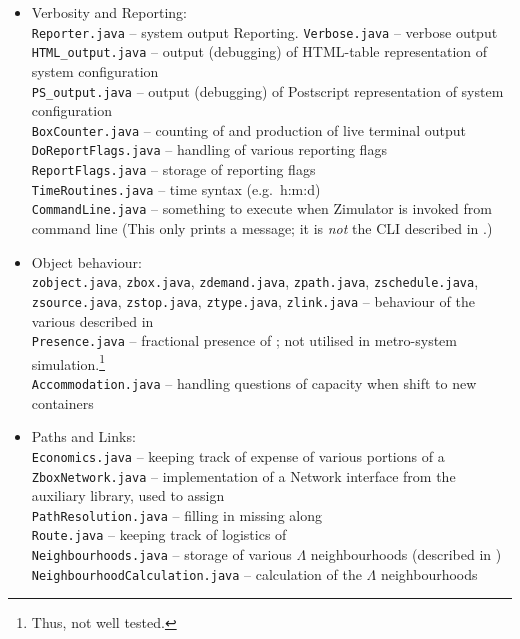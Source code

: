 \begin{itemize}
\item Verbosity and Reporting:  \\
  {\tt Reporter.java} -- system output Reporting.
  {\tt Verbose.java} -- verbose output
  {\tt HTML\_output.java} -- output (debugging) of HTML-table representation of system  configuration\\
  {\tt PS\_output.java} -- output (debugging) of Postscript representation of system  configuration\\
  {\tt BoxCounter.java} -- counting of  and production of live terminal output\\
  {\tt DoReportFlags.java} -- handling of various reporting flags\\
  {\tt ReportFlags.java} -- storage of reporting flags\\
  {\tt TimeRoutines.java} -- time syntax (e.g.~h:m:d)\\
  {\tt CommandLine.java} -- something to execute when Zimulator is invoked from command line
  (This only prints a message; it is \emph{not} the CLI described in .)
\item Object behaviour:\\
  {\tt  zobject.java},
  {\tt  zbox.java},
  {\tt  zdemand.java},
  {\tt  zpath.java},
  {\tt  zschedule.java},
  {\tt  zsource.java},
  {\tt  zstop.java},
  {\tt  ztype.java},
  {\tt  zlink.java} -- behaviour of the various  described in \\
{\tt  Presence.java} -- fractional presence of ; not utilised in metro-system simulation.\footnote{Thus, not well tested.}\\
{\tt  Accommodation.java} -- handling questions of capacity when  shift to new containers
\item Paths and Links: \\
  {\tt   Economics.java} -- keeping track of expense of various portions of a \\
  {\tt   ZboxNetwork.java} -- implementation of a Network interface from the auxiliary library, used to assign \\
  {\tt   PathResolution.java} -- filling in missing  along \\
  {\tt   Route.java} -- keeping track of logistics of \\
  {\tt   Neighbourhoods.java} -- storage of various $\Lambda$ neighbourhoods (described in )\\
  {\tt   NeighbourhoodCalculation.java} -- calculation of the $\Lambda$ neighbourhoods 
\end{itemize}

